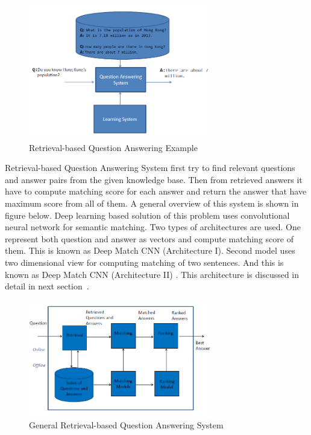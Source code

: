 \documentclass{doublecol-new}
\theoremstyle{TH}{
\newtheorem{lemma}{Lemma}
\newtheorem{theorem}[lemma]{Theorem}
\newtheorem{corrolary}[lemma]{Corrolary}
\newtheorem{conjecture}[lemma]{Conjecture}
\newtheorem{proposition}[lemma]{Proposition}
\newtheorem{claim}[lemma]{Claim}
\newtheorem{stheorem}[lemma]{Wrong Theorem}
\newtheorem{algorithm}{Algorithm}
}
\theoremstyle{THrm}{
\newtheorem{definition}{Definition}[section]
\newtheorem{question}{Question}[section]
\newtheorem{remark}{Remark}
\newtheorem{scheme}{Scheme}
}
\theoremstyle{THhit}{
\newtheorem{case}{Case}[section]
}
\begin{document}
\begin{figure}[h]
	\centerline{\includegraphics[width=8cm,keepaspectratio]{image/retrieval-based-QA.PNG}}
	\label{fig:Retrieval-based Question Answering}
	\caption{Retrieval-based Question Answering Example}
\end{figure}
Retrieval-based Question Answering System first try to find relevant questions and answer pairs from the given knowledge base. Then from retrieved answers it have to compute matching score for each answer and return the answer that have maximum score from all of them. A general overview of this system is shown in figure below. Deep learning based solution of this problem uses convolutional neural network for semantic matching. Two types of architectures are used. One represent both question and answer as vectors and compute matching score of them. This is known as Deep Match CNN (Architecture I). Second model uses two dimensional view for computing matching of two sentences. And this is known as Deep Match CNN (Architecture II) . This architecture is discussed in detail in next section~\cite{hu2014convolutional,ji2014information}.  
\begin{figure}[h]
	\centerline{\includegraphics[width=8cm,keepaspectratio]{image/retrieval-based-QAS.PNG}}
	\label{fig:Retrieval-based Question Answering System}
	\caption{General Retrieval-based Question Answering System}
\end{figure}
\end{document}
